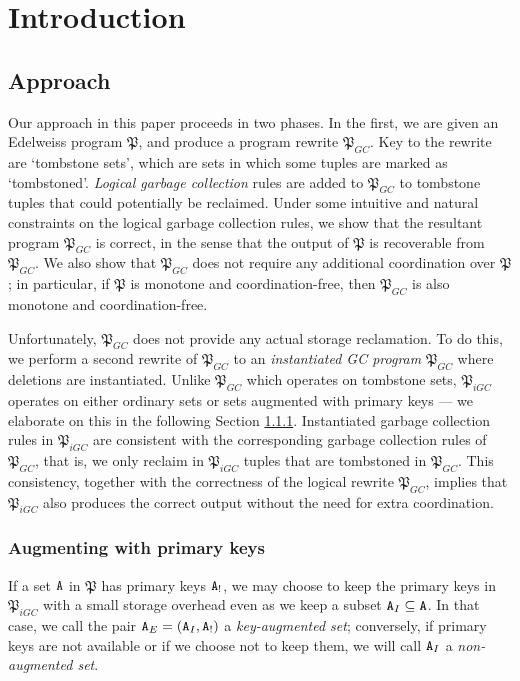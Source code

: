 \documentclass{article}
\numberwithin{equation}{section}
\renewcommand{\tt}[1]{\ifmmode\text{\texttt{#1}}\else\texttt{#1}\fi}
\begin{document}
\section{Introduction}

\subsection{Approach}
Our approach in this paper proceeds in two phases.
In the first, we are given an Edelweiss program $\mathfrak{P}$, and produce a program rewrite $\mathfrak{P}_{GC}$.
Key to the rewrite are `tombstone sets', which are sets in which some tuples are marked as `tombstoned'.
\emph{Logical garbage collection} rules are added to $\mathfrak{P}_{GC}$ to tombstone tuples that could potentially be reclaimed.
Under some intuitive and natural constraints on the logical garbage collection rules, we show that the resultant program $\mathfrak{P}_{GC}$ is correct, in the sense that the output of $\mathfrak{P}$ is recoverable from $\mathfrak{P}_{GC}$.
We also show that $\mathfrak{P}_{GC}$ does not require any additional coordination over $\mathfrak{P}$;
in particular, if $\mathfrak{P}$ is monotone and coordination-free, then $\mathfrak{P}_{GC}$ is also monotone and coordination-free.

Unfortunately, $\mathfrak{P}_{GC}$ does not provide any actual storage reclamation.
To do this, we perform a second rewrite of $\mathfrak{P}_{GC}$ to an \emph{instantiated GC program} $\mathfrak{P}_{GC}$ where deletions are instantiated.
Unlike $\mathfrak{P}_{GC}$ which operates on tombstone sets, $\mathfrak{P}_{iGC}$ operates on either ordinary sets or sets augmented with primary keys --- we elaborate on this in the following Section \ref{sec:intro:approach:augment}.
Instantiated garbage collection rules in $\mathfrak{P}_{iGC}$ are consistent with the corresponding garbage collection rules of $\mathfrak{P}_{GC}$, that is, we only reclaim in $\mathfrak{P}_{iGC}$ tuples that are tombstoned in $\mathfrak{P}_{GC}$.
This consistency, together with the correctness of the logical rewrite $\mathfrak{P}_{GC}$, implies that $\mathfrak{P}_{iGC}$ also produces the correct output without the need for extra coordination.

\subsubsection{Augmenting with primary keys}
\label{sec:intro:approach:augment}
If a set $\tt{A}$ in $\mathfrak{P}$ has primary keys $\tt{A}_!$, we may choose to keep the primary keys in $\mathfrak{P}_{iGC}$ with a small storage overhead even as we keep a subset $\tt{A}_I \subseteq \tt{A}$.
In that case, we call the pair $\tt{A}_E = (\tt{A}_I, \tt{A}_!)$ a \emph{key-augmented set};
conversely, if primary keys are not available or if we choose not to keep them, we will call $\tt{A}_I$ a \emph{non-augmented set}.
\end{document}
